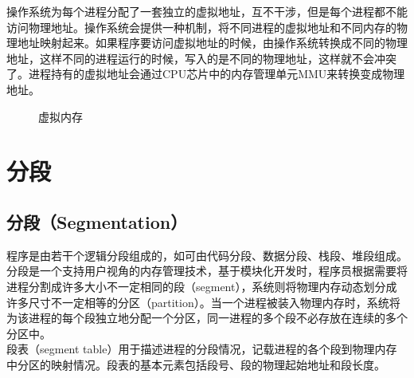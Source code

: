 操作系统为每个进程分配了一套独立的虚拟地址，互不干涉，但是每个进程都不能访问物理地址。操作系统会提供一种机制，将不同进程的虚拟地址和不同内存的物理地址映射起来。如果程序要访问虚拟地址的时候，由操作系统转换成不同的物理地址，这样不同的进程运行的时候，写入的是不同的物理地址，这样就不会冲突了。进程持有的虚拟地址会通过CPU芯片中的内存管理单元MMU来转换变成物理地址。

\begin{figure}[H]
    \centering
    \caption{虚拟内存}
\end{figure}

\newpage

\section{分段}

\subsection{分段（Segmentation）}

程序是由若干个逻辑分段组成的，如可由代码分段、数据分段、栈段、堆段组成。分段是一个支持用户视角的内存管理技术，基于模块化开发时，程序员根据需要将进程分割成许多大小不一定相同的段（segment），系统则将物理内存动态划分成许多尺寸不一定相等的分区（partition）。当一个进程被装入物理内存时，系统将为该进程的每个段独立地分配一个分区，同一进程的多个段不必存放在连续的多个分区中。\\

段表（segment table）用于描述进程的分段情况，记载进程的各个段到物理内存中分区的映射情况。段表的基本元素包括段号、段的物理起始地址和段长度。


